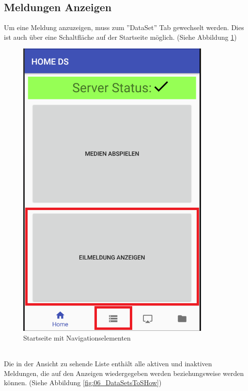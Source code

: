 \subsection{Meldungen Anzeigen}
Um eine Meldung anzuzeigen, muss zum ''DataSet'' Tab gewechselt werden. Dies ist auch über eine Schaltfläche auf der Startseite möglich. (Siehe Abbildung \ref{fig:06_dataSetNavigation})
\begin{figure}[H]
\centering
\includegraphics[scale=0.35]{images/06_AndroidApp/06_dataSetNavigation}
\caption{Startseite mit Navigationselementen}
\label{fig:06_dataSetNavigation}
\end{figure}
\\
Die in der Ansicht zu sehende Liste enthält alle aktiven und  inaktiven Meldungen, die auf den Anzeigen wiedergegeben werden beziehungsweise werden können.
(Siehe Abbildung \ref{fig:06_DataSetsToSHow}) 
\\
